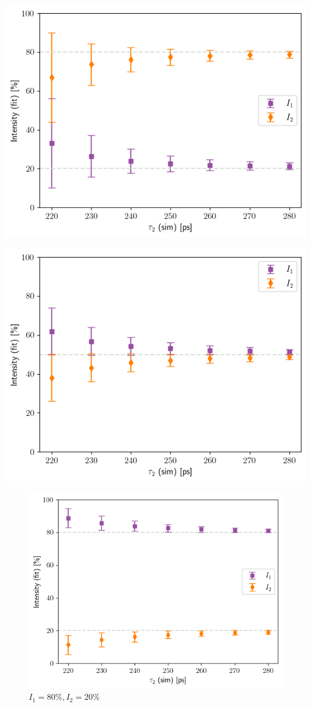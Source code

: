 \begin{minipage}{.45\linewidth}
    \includegraphics[width=\linewidth]{Batch 1+2/Batch1+2/output/plotfin/2080.png}
    \label{fig:180-2080}
\end{minipage}
\hfill
\begin{minipage}{.45\linewidth}
    \includegraphics[width=\linewidth]{Batch 1+2/Batch1+2/output/plotfin/5050.png}
    \label{fig:180-5050}
\end{minipage}
\begin{figure}[h]
    \includegraphics[width=0.45\linewidth]{Batch 1+2/Batch1+2/output/plotfin/8020.png}
    \caption{$I_1 = 80\%, I_2 = 20\%$}
    \label{fig:180-8020}
\end{figure}

